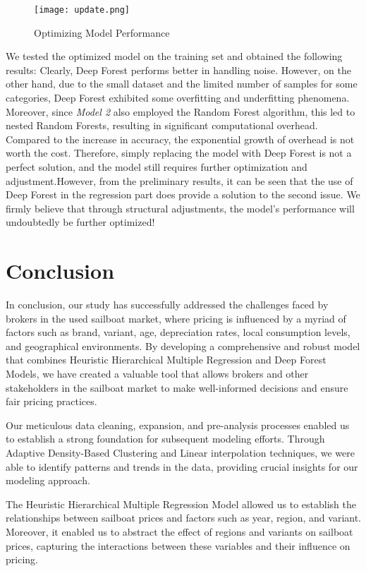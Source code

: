 \documentclass[12pt]{article}  %
\begin{document}
\begin{figure}[htbp]
    \centering
    \texttt{[image: update.png]}
    \caption{Optimizing Model Performance}\label{fig:update}
\end{figure}

We tested the optimized model on the training set and obtained the following results: Clearly, Deep Forest performs better in handling noise. However, on the other hand, due to the small dataset and the limited number of samples for some categories, Deep Forest exhibited some overfitting and underfitting phenomena. Moreover, since \emph{Model 2} also employed the Random Forest algorithm, this led to nested Random Forests, resulting in significant computational overhead. Compared to the increase in accuracy, the exponential growth of overhead is not worth the cost. Therefore, simply replacing the model with Deep Forest is not a perfect solution, and the model still requires further optimization and adjustment.However, from the preliminary results, it can be seen that the use of Deep Forest in the regression part does provide a solution to the second issue. We firmly believe that through structural adjustments, the model's performance will undoubtedly be further optimized!


\section{Conclusion}
In conclusion, our study has successfully addressed the challenges faced by brokers in the used sailboat market, where pricing is influenced by a myriad of factors such as brand, variant, age, depreciation rates, local consumption levels, and geographical environments. By developing a comprehensive and robust model that combines Heuristic Hierarchical Multiple Regression and Deep Forest Models, we have created a valuable tool that allows brokers and other stakeholders in the sailboat market to make well-informed decisions and ensure fair pricing practices.

Our meticulous data cleaning, expansion, and pre-analysis processes enabled us to establish a strong foundation for subsequent modeling efforts. Through Adaptive Density-Based Clustering and Linear interpolation techniques, we were able to identify patterns and trends in the data, providing crucial insights for our modeling approach.

The Heuristic Hierarchical Multiple Regression Model allowed us to establish the relationships between sailboat prices and factors such as year, region, and variant. Moreover, it enabled us to abstract the effect of regions and variants on sailboat prices, capturing the interactions between these variables and their influence on pricing.
\end{document}
